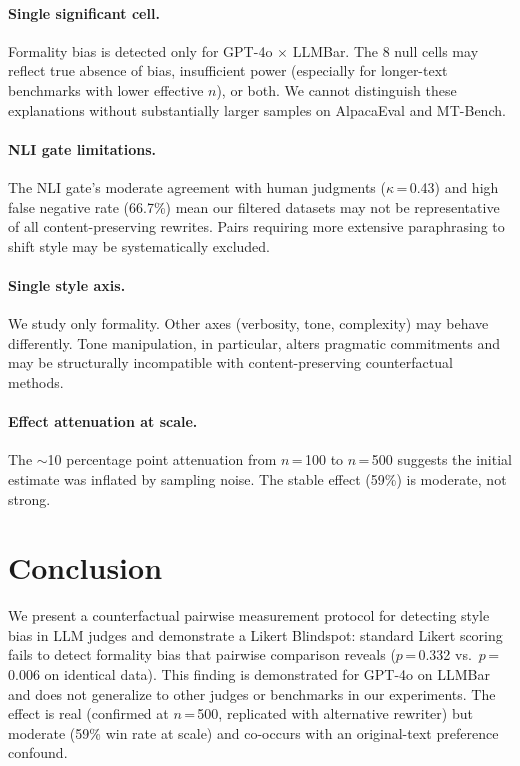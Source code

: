 \documentclass[11pt,a4paper]{article}
\begin{document}
\paragraph{Single significant cell.}
Formality bias is detected only for GPT-4o $\times$ LLMBar.
The 8 null cells may reflect true absence of bias, insufficient power (especially for longer-text benchmarks with lower effective $n$), or both.
We cannot distinguish these explanations without substantially larger samples on AlpacaEval and MT-Bench.

\paragraph{NLI gate limitations.}
The NLI gate's moderate agreement with human judgments ($\kappa$\,=\,0.43) and high false negative rate (66.7\%) mean our filtered datasets may not be representative of all content-preserving rewrites.
Pairs requiring more extensive paraphrasing to shift style may be systematically excluded.

\paragraph{Single style axis.}
We study only formality.
Other axes (verbosity, tone, complexity) may behave differently.
Tone manipulation, in particular, alters pragmatic commitments and may be structurally incompatible with content-preserving counterfactual methods.

\paragraph{Effect attenuation at scale.}
The $\sim$10 percentage point attenuation from $n$\,=\,100 to $n$\,=\,500 suggests the initial estimate was inflated by sampling noise.
The stable effect (59\%) is moderate, not strong.

\section{Conclusion}

We present a counterfactual pairwise measurement protocol for detecting style bias in LLM judges and demonstrate a Likert Blindspot: standard Likert scoring fails to detect formality bias that pairwise comparison reveals ($p$\,=\,0.332 vs.\ $p$\,=\,0.006 on identical data).
This finding is demonstrated for GPT-4o on LLMBar and does not generalize to other judges or benchmarks in our experiments.
The effect is real (confirmed at $n$\,=\,500, replicated with alternative rewriter) but moderate (59\% win rate at scale) and co-occurs with an original-text preference confound.
\end{document}
